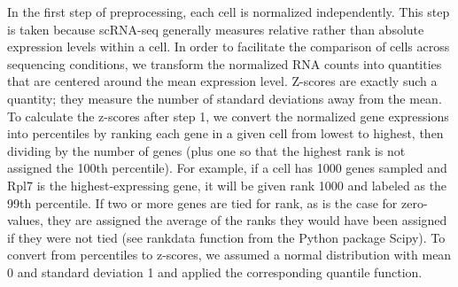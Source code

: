\documentclass[aps,superscriptaddress, notitlepage,longbibliography]{revtex4-1}
\begin{document}
In the first step of preprocessing, each cell is normalized independently. This step is taken because scRNA-seq generally measures relative rather than absolute expression levels within a cell. In order to facilitate the comparison of cells across sequencing conditions, we transform the normalized RNA counts into quantities that are centered around the mean expression level. Z-scores are exactly such a quantity; they measure the number of standard deviations away from the mean. To calculate the z-scores after step 1, we convert the normalized gene expressions into percentiles by ranking each gene in a given cell from lowest to highest, then dividing by the number of genes (plus one so that the highest rank is not assigned the 100th percentile). For example, if a cell has 1000 genes sampled and Rpl7 is the highest-expressing gene, it will be given rank 1000 and labeled as the 99th percentile. If two or more genes are tied for rank, as is the case for zero-values, they are assigned the average of the ranks they would have been assigned if they were not tied (see rankdata function from the Python package Scipy). To convert from percentiles to z-scores, we assumed a normal distribution with mean 0 and standard deviation 1 and applied the corresponding quantile function.
\end{document}
